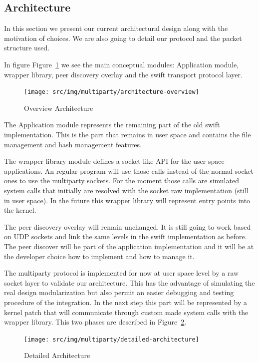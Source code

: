 \subsection{Architecture}

In this section we present our current architectural design along with the
motivation of choices. We are also going to detail our protocol and the packet
structure used.

In figure Figure~\ref{fig:multiparty:architecture-overview} we see the main
conceptual modules: Application module, wrapper library, peer discovery
overlay and the swift transport protocol layer.

\begin{figure}
  \centering
  \texttt{[image: src/img/multiparty/architecture-overview]}
  \caption{Overview Architecture}
  \label{fig:multiparty:architecture-overview}
\end{figure}

The Application module represents the remaining part of the old swift
implementation. This is the part that remains in user space and contains the
file management and hash management features. 

The wrapper library module defines a socket-like API for the user space
applications. An regular program will use those calls instead of the normal
socket ones to use the multiparty sockets. For the moment those calls are
simulated system calls that initially are resolved with the socket raw
implementation (still in user space). In the future this wrapper library
will represent entry points into the kernel.

The peer discovery overlay will remain unchanged. It is still going to work
based on UDP sockets and link the same levels in the swift implementation as
before. The peer discover will be part of the application implementation and
it will be at the developer choice how to implement and how to manage it.

The multiparty protocol is implemented for now at user space level by a raw
socket layer to validate our architecture.  This has the advantage of
simulating the real design modularization but also permit an easier debugging
and testing procedure of the integration. In the next step this part will be
represented by a kernel patch that will communicate through custom made system
calls with the wrapper library. This two phases are described in
Figure~\ref{fig:multiparty:detailed-architecture}.

\begin{figure}
  \centering
  \texttt{[image: src/img/multiparty/detailed-architecture]}
  \caption{Detailed Architecture}
  \label{fig:multiparty:detailed-architecture}
\end{figure}

